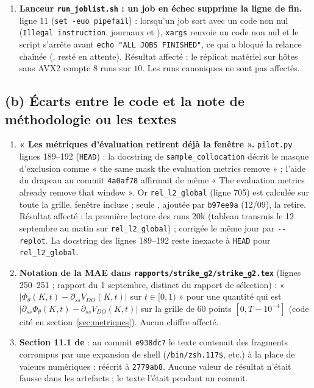 \documentclass[11pt]{article}
\newcommand{\VDO}{V_{DO}}
\newcommand{\code}[1]{\texttt{#1}}
\begin{document}
\begin{enumerate}
  effective loguée depuis \code{0763373} :
  \code{BlackScholesCornerExtension ... two-term analytic}). Voir (c)~1 pour la
  conclusion.
\item \textbf{Lanceur \code{run\_joblist.sh} : un job en échec supprime la
  ligne de fin.}  ligne 11
  (\code{set -euo pipefail}) : lorsqu'un job sort avec un code non nul
  (\code{Illegal instruction}, journaux
   et
  ), \code{xargs} renvoie un code
  non nul et le script s'arrête avant \code{echo "ALL JOBS FINISHED"}, ce qui
  a bloqué la relance chaînée (,
  resté en attente). Résultat affecté : le réplicat matériel sur hôtes sans
  AVX2 compte $8$ runs sur $10$. Les runs canoniques ne sont pas affectés.
\end{enumerate}

\subsection*{(b) Écarts entre le code et la note de méthodologie ou les textes}

\begin{enumerate}
\item \textbf{« Les métriques d'évaluation retirent déjà la fenêtre ».}
  \code{pilot.py} lignes 189--192 (\code{HEAD}) : la docstring de
  \code{sample\_collocation} décrit le masque d'exclusion comme « the same mask
  the evaluation metrics remove » ; l'aide du drapeau au commit \code{4a0af78}
  affirmait de même « The evaluation metrics already remove that window ».
  Or \code{rel\_l2\_global} (ligne 705) est calculée sur toute la grille,
  fenêtre incluse ; seule , ajoutée par
  \code{b97ee9a} (12/09), la retire. Résultat affecté : la première lecture
  des runs 20k (tableau transmis le 12 septembre au matin sur
  \code{rel\_l2\_global}) ; corrigée le même jour par \code{-{}-replot}. La
  docstring des lignes 189--192 reste inexacte à \code{HEAD} pour
  \code{rel\_l2\_global}.
\item \textbf{Notation de la MAE dans \code{rapports/strike\_g2/strike\_g2.tex}} (lignes
  250--251 ; rapport du 1 septembre, distinct du rapport de sélection) : « $|\Phi_\theta(K,t)-\partial_{ss}\VDO(K,t)|$ sur $t\in[0,1)$ »
  pour une quantité qui est
  $|\partial_{ss}\Phi_\theta(K,t)-\partial_{ss}\VDO(K,t)|$ sur la grille de
  $60$ points $[0,T-10^{-4}]$ (code cité en section~\ref{sec:metriques}).
  Aucun chiffre affecté.
\item \textbf{Section 11.1 de }
  : au commit \code{e938dc7} le texte contenait des fragments corrompus par
  une expansion de shell (\code{/bin/zsh.117\$}, etc.) à la place de valeurs
  numériques ; réécrit à \code{2779ab8}. Aucune valeur de résultat
  n'était fausse dans les artefacts ; le texte l'était pendant un commit.
\end{enumerate}
\end{document}
